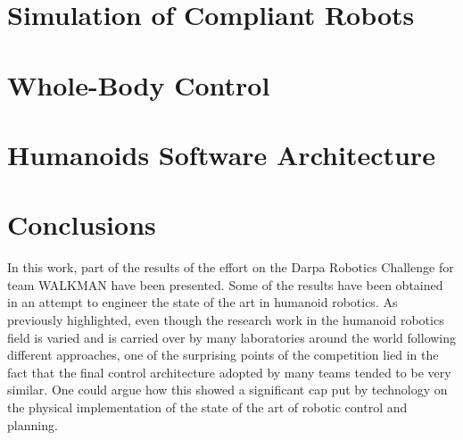 \documentclass[%
	paper=A4,					%
	twoside=true,				%
	openright,			.
	parskip=full,				%
	chapterprefix=true,			%
	11pt,						%
	headings=normal,			%
	bibliography=totoc,			%
	listof=totoc,				%
	titlepage=on,				%
	captions=tableabove,		%
	draft=false,				%
]{scrreprt}%
\begin{document}
 
\chapter{Simulation of Compliant Robots}
\label{simulator}


\chapter{Whole-Body Control}
\label{opensot}


\chapter{Humanoids Software Architecture}
\label{architecture}


\chapter{Conclusions}

In this work, part of the results of the effort on the Darpa Robotics Challenge for team WALKMAN have been presented.
Some of the results have been obtained in an attempt to engineer the state of the art in humanoid robotics.
As previously highlighted, even though the research work in the humanoid robotics field is varied and is carried over by many laboratories around the world following different approaches, one of the surprising points of the competition lied in the fact that the final control architecture adopted by many teams tended to be very similar. One could argue how this showed a significant cap put by technology on the physical implementation of the state of the art of robotic control and planning.
\end{document}
